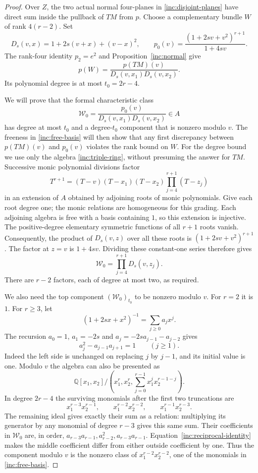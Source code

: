 \begin{proof}
Over $Z$, the two actual normal four-planes in
\eqref{inc:disjoint-planes} have direct sum inside the pullback
of $TM$ from $p$. Choose a complementary bundle $W$ of rank
$4(r-2)$. Set
\[
 D_s(v,x)=1+2s(v+x)+(v-x)^2,
 \qquad p_0(v)=\frac{(1+2sv+v^2)^{r+1}}{1+4sv}.
\]
The rank-four identity $p_2=e^2$
\citep[Corollary~15.8]{MilnorStasheff1974} and
Proposition~\ref{inc:normal} give
\begin{equation}\label{inc:complement}
 p(W)=\frac{p(TM)(v)}{D_s(v,x_1)D_s(v,x_2)}.
\end{equation}
Its polynomial degree is at most $t_0=2r-4$.

We will prove that the formal characteristic class
\[
 \mathcal W_0=\frac{p_0(v)}{D_s(v,x_1)D_s(v,x_2)}\in A
\]
has degree at most $t_0$ and a degree-$t_0$ component that is nonzero
modulo $v$. The freeness in
\eqref{inc:free-basis} will then show that any first discrepancy
between $p(TM)(v)$ and $p_0(v)$ violates the rank bound on $W$.
For the degree bound we use only the algebra
\eqref{inc:triple-ring}, without presuming the answer for $TM$.
Successive monic polynomial divisions factor
\[
 T^{r+1}=(T-v)(T-x_1)(T-x_2)
                   \prod_{j=4}^{r+1}(T-z_j)
\]
in an extension of $A$ obtained by adjoining roots of monic
polynomials. Give each root degree one; the monic relations
are homogeneous for this grading. Each adjoining algebra is
free with a basis containing $1$, so this extension is injective. The positive-degree
elementary symmetric functions of all $r+1$ roots vanish.
Consequently, the product of $D_s(v,z)$ over all these roots is
$(1+2sv+v^2)^{r+1}$. The factor at $z=v$ is $1+4sv$.
Dividing these constant-one series therefore gives
\[
 \mathcal W_0=\prod_{j=4}^{r+1}D_s(v,z_j).
\]
There are $r-2$ factors, each of degree at most two, as required.

We also need the top component $(\mathcal W_0)_{t_0}$ to be nonzero
modulo $v$. For $r=2$ it is $1$. For $r\ge3$, let
\[
 (1+2sx+x^2)^{-1}=\sum_{j\ge0}a_jx^j.
\]
The recursion $a_0=1$, $a_1=-2s$ and
$a_j=-2sa_{j-1}-a_{j-2}$ gives
\begin{equation}\label{inc:reciprocal-identity}
 a_j^2-a_{j-1}a_{j+1}=1\qquad(j\ge1).
\end{equation}
Indeed the left side is unchanged on replacing $j$ by $j-1$,
and its initial value is one. Modulo $v$ the algebra can also be
presented as
\[
 \mathbb Q[x_1,x_2]/
 \left(x_1^r,x_2^r,\sum_{j=0}^{r-1}x_1^jx_2^{r-1-j}\right).
\]
In degree $2r-4$ the surviving monomials after the first two
truncations are
\[
 x_1^{r-3}x_2^{r-1},\qquad
 x_1^{r-2}x_2^{r-2},\qquad x_1^{r-1}x_2^{r-3}.
\]
The remaining ideal gives exactly their sum as a relation:
multiplying its generator by any monomial of degree $r-3$
gives this same sum. Their coefficients in $\mathcal W_0$ are, in order,
$a_{r-3}a_{r-1},a_{r-2}^2,a_{r-3}a_{r-1}$.
Equation~\eqref{inc:reciprocal-identity} makes the middle
coefficient differ from either outside coefficient by one.
Thus the component modulo $v$ is the nonzero class of
$x_1^{r-2}x_2^{r-2}$, one of the monomials in
\eqref{inc:free-basis}.


\end{proof}
